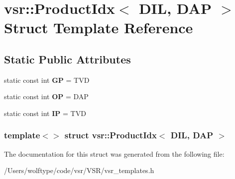\hypertarget{structvsr_1_1_product_idx_3_01_d_i_l_00_01_d_a_p_01_4}{\section{vsr\-:\-:Product\-Idx$<$ D\-I\-L, D\-A\-P $>$ Struct Template Reference}
\label{structvsr_1_1_product_idx_3_01_d_i_l_00_01_d_a_p_01_4}
}
\subsection*{Static Public Attributes}
\begin{DoxyCompactItemize}
\item 
\hypertarget{structvsr_1_1_product_idx_3_01_d_i_l_00_01_d_a_p_01_4_aacee03bd77792f75a69e3ff46447f2ad}{static const int {\bfseries G\-P} = T\-V\-D}\label{structvsr_1_1_product_idx_3_01_d_i_l_00_01_d_a_p_01_4_aacee03bd77792f75a69e3ff46447f2ad}

\item 
\hypertarget{structvsr_1_1_product_idx_3_01_d_i_l_00_01_d_a_p_01_4_ad60cf6a56f155fcb3231e4a5696f7af8}{static const int {\bfseries O\-P} = D\-A\-P}\label{structvsr_1_1_product_idx_3_01_d_i_l_00_01_d_a_p_01_4_ad60cf6a56f155fcb3231e4a5696f7af8}

\item 
\hypertarget{structvsr_1_1_product_idx_3_01_d_i_l_00_01_d_a_p_01_4_a3fb08e6b1b6cef217b1d4adf81888d72}{static const int {\bfseries I\-P} = T\-V\-D}\label{structvsr_1_1_product_idx_3_01_d_i_l_00_01_d_a_p_01_4_a3fb08e6b1b6cef217b1d4adf81888d72}

\end{DoxyCompactItemize}
\subsubsection*{template$<$$>$ struct vsr\-::\-Product\-Idx$<$ D\-I\-L, D\-A\-P $>$}



The documentation for this struct was generated from the following file\-:\begin{DoxyCompactItemize}
\item 
/\-Users/wolftype/code/vsr/\-V\-S\-R/vsr\-\_\-templates.\-h\end{DoxyCompactItemize}
